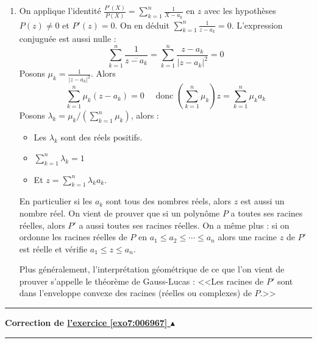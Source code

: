 \documentclass[11pt,a4paper]{article}
\renewcommand{\le}{\leqslant} \renewcommand{\leq}{\leqslant}
\newcounter{exo}
\newcommand{\correction}[1]{\hypertarget{cor7:#1}{}\label{cor7:#1}{\bf Correction de \hyperlink{exo7:#1}{l'exercice \ref{exo7:#1} $\blacktriangle$}}\vspace{1mm}\hrule\vspace{1mm}}
\newcommand{\fincorrection}{\vspace{1mm}\hrule\vspace*{7mm}}
\begin{document}
\begin{enumerate}
\item On applique l'identité  $\frac{P'(X)}{P(X)}=\sum_{k=1}^n\frac{1}{X-a_k}$ en $z$ avec les hypothèses 
$P(z)\not=0$ et $P'(z)=0$.
On en déduit $\displaystyle \sum_{k=1}^n\frac{1}{z-a_k} = 0$.
L'expression conjuguée est aussi nulle :
$$\sum_{k=1}^n\frac{1}{\overline{z-a_k}}=\sum_{k=1}^n\frac{z-a_k}{|z-a_k|^2} = 0$$
Posons $\mu_k = \frac{1}{|z-a_k|^2}$.
Alors 
$$\sum_{k=1}^n \mu_k(z-a_k) = 0 \quad \text{ donc } \left(\sum_{k=1}^n \mu_k \right) z = \sum_{k=1}^n \mu_k a_k$$
Posons $\lambda_k = \mu_k / \left(\sum_{k=1}^n \mu_k \right)$,
alors : 
  \begin{itemize}
    \item Les $\lambda_k$ sont des réels positifs.
    \item $\sum_{k=1}^n\lambda_k=1$
    \item Et $z=\sum_{k=1}^n\lambda_ka_k$.
  \end{itemize}

En particulier si les $a_k$ sont tous des nombres réels, alors $z$ est aussi un nombre réel.
On vient de prouver que si un polynôme $P$ a toutes ses racines réelles, 
alors $P'$ a aussi toutes ses racines réelles. On a même plus : si on ordonne les racines réelles 
de $P$ en $a_1 \le a_2 \le \cdots \le a_n$ alors une racine $z$ de $P'$ est réelle et vérifie $a_1 \le z \le a_n$.

Plus généralement, l'interprétation géométrique de ce que l'on vient de prouver s'appelle le théorème de Gauss-Lucas :
<<Les racines de $P'$ sont dans l'enveloppe convexe des racines (réelles ou complexes) de $P$.>>
\end{enumerate}
\fincorrection
\correction{006967}\
\end{document}
